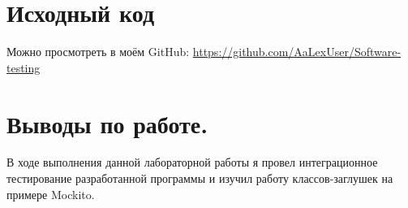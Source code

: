 \documentclass[12pt,onecolumn]{article}
\begin{document}
\section*{Исходный код}
Можно просмотреть в моём GitHub: \href{https://github.com/AaLexUser/Software-testing}{https://github.com/AaLexUser/Software-testing}
\section*{Выводы по работе.}
В ходе выполнения данной лабораторной работы я провел интеграционное тестирование разработанной программы и изучил работу классов-заглушек на примере Mockito.
\end{document}
